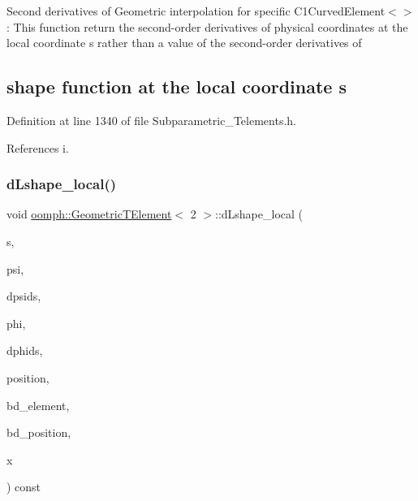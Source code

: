 Second derivatives of Geometric interpolation for specific C1\+Curved\+Element$<$$>$\+: This function return the second-\/order derivatives of physical coordinates at the local coordinate s rather than a value of the second-\/order derivatives of \subsection*{shape function at the local coordinate s }

Definition at line 1340 of file Subparametric\+\_\+\+Telements.\+h.



References i.

\mbox{\label{classoomph_1_1GeometricTElement_3_012_01_4_a3ab2648ee1e98ad31c5246a8bd189556}} 
\subsubsection{\texorpdfstring{d\+Lshape\+\_\+local()}{dLshape\_local()}}
{\footnotesize\ttfamily void \hyperlink{classoomph_1_1GeometricTElement}{oomph\+::\+Geometric\+T\+Element}$<$ 2 $>$\+::d\+Lshape\+\_\+local (\begin{DoxyParamCaption}\item[{const \hyperlink{classoomph_1_1Vector}{Vector}$<$ double $>$ \&}]{s,  }\item[{\hyperlink{classoomph_1_1Shape}{Shape} \&}]{psi,  }\item[{\hyperlink{classoomph_1_1DShape}{D\+Shape} \&}]{dpsids,  }\item[{\hyperlink{classoomph_1_1Shape}{Shape} \&}]{phi,  }\item[{\hyperlink{classoomph_1_1DShape}{D\+Shape} \&}]{dphids,  }\item[{\hyperlink{classoomph_1_1DenseMatrix}{Dense\+Matrix}$<$ double $>$ \&}]{position,  }\item[{unsigned \&}]{bd\+\_\+element,  }\item[{\hyperlink{classoomph_1_1DenseMatrix}{Dense\+Matrix}$<$ double $>$ \&}]{bd\+\_\+position,  }\item[{\hyperlink{classoomph_1_1Vector}{Vector}$<$ double $>$ \&}]{x }\end{DoxyParamCaption}) const\hspace{0.3cm}{\ttfamily [inline]}}

